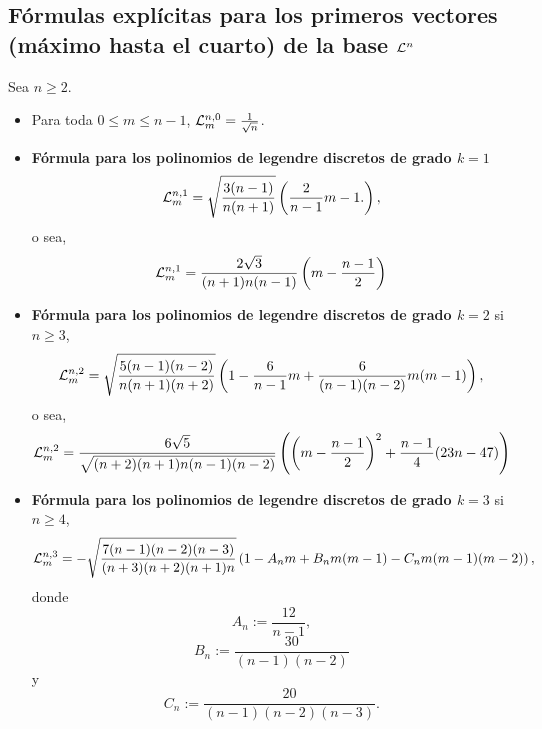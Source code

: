 \subsection{Fórmulas explícitas para los primeros vectores (máximo hasta el cuarto) de la base $\mathcal{L}^{n}$}

Sea $n \geq 2$.
\begin{itemize}
\item Para toda $0 \leq m \leq n-1$, 
$\mathcal{L}^{n,0}_{m}=\frac{1}{\sqrt{n}}$.

\item \textbf{Fórmula para los polinomios de legendre discretos
de grado $k=1$}
\[
\mathcal{L}^{n,1}_{m}=\sqrt{\frac{3(n-1)}{n(n+1)}} \left( \frac{2}{n-1}m -1. \right),
\]
o sea, 
\[
\mathcal{L}^{n,1}_{m}=\frac{2\sqrt{3}}{(n+1)n(n-1)} \left( m-\frac{n-1}{2} \right)
\]


\item \textbf{Fórmula para los polinomios de legendre discretos
de grado $k=2$} si $n \geq 3$,
\[
\mathcal{L}^{n,2}_{m}=\sqrt{\frac{5(n-1)(n-2)}{n(n+1)(n+2)}} \left(1- \frac{6}{n-1}m + \frac{6}{(n-1)(n-2)}m(m-1) \right),
\]
o sea, 
\[
\mathcal{L}^{n,2}_{m}=\frac{6\sqrt{5}}{\sqrt{(n+2)(n+1)n(n-1)(n-2)}} \left(
\left( m-\frac{n-1}{2} \right)^{2}+\frac{n-1}{4}(23n-47)
\right)
\]


\item \textbf{Fórmula para los polinomios de legendre discretos
de grado $k=3$} si $n \geq 4$,
\[
\mathcal{L}^{n,3}_{m}=-\sqrt{\frac{7(n-1)(n-2)(n-3)}{(n+3)(n+2)(n+1)n}}
\left( 1- A_{n}m + B_{n}m(m-1)-
C_{n}m(m-1)(m-2) \right),
\]
donde
\[
A_{n}:= \frac{12}{n-1},
\]
\[
B_{n} := \frac{30}{(n-1)(n-2)}
\]
y
\[
C_{n} := \frac{20}{(n-1)(n-2)(n-3)}.
\]
\end{itemize}

